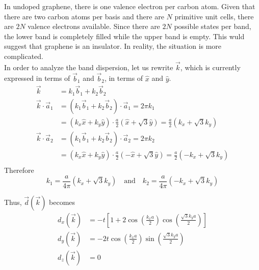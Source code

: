 \documentclass[12pt,a4paper,titlepage]{article}
\newcommand{\trm}[1]{\textrm{#1}} %
\begin{document}
In undoped graphene, there is one valence electron per carbon atom. Given that there are two carbon atoms per basis and there are $N$ primitive unit cells, there are $2N$ valence electrons available. Since there are $2N$ possible states per band, the lower band is completely filled while the upper band is empty. This wuld suggest that graphene is an insulator. In reality, the situation is more complicated.\\

In order to analyze the band dispersion, let us rewrite $\vec{k}$, which is currently expressed in terms of $\vec{b}_{1}$ and $\vec{b}_{2}$, in terms of $\hat{x}$ and $\hat{y}$.
\begin{equation}
\begin{aligned}
\vec{k}&=k_{1}\vec{b}_{1}+k_{2}\vec{b}_{2}\\
\vec{k}\cdot\vec{a}_{1}&=(k_{1}\vec{b}_{1}+k_{2}\vec{b}_{2})\cdot\vec{a}_{1}=2\pi k_{1}\\
&=(k_{x}\hat{x}+k_{y}\hat{y})\cdot\frac{a}{2}(\hat{x}+\sqrt{3}\hat{y})=\frac{a}{2}(k_{x}+\sqrt{3}k_{y})\\
\vec{k}\cdot\vec{a}_{2}&=(k_{1}\vec{b}_{1}+k_{2}\vec{b}_{2})\cdot\vec{a}_{2}=2\pi k_{2}\\
&=(k_{x}\hat{x}+k_{y}\hat{y})\cdot\frac{a}{2}(-\hat{x}+\sqrt{3}\hat{y})=\frac{a}{2}(-k_{x}+\sqrt{3}k_{y})\\
\end{aligned}
\end{equation}
Therefore
\begin{equation}
k_{1}=\frac{a}{4\pi}(k_{x}+\sqrt{3}k_{y})\quad\trm{and}\quad k_{2}=\frac{a}{4\pi}(-k_{x}+\sqrt{3}k_{y})
\end{equation}

Thus, $\vec{d}(\vec{k})$ becomes
\begin{equation}
\begin{aligned}
d_{x}(\vec{k})&=-t\left[1+2\cos\left(\frac{k_{x}a}{2}\right)\cos\left(\frac{\sqrt{3}k_{y}a}{2}\right)\right]\\
d_{y}(\vec{k})&=-2t\cos\left(\frac{k_{x}a}{2}\right)\sin\left(\frac{\sqrt{3}k_{y}a}{2}\right)\\
d_{z}(\vec{k})&=0
\end{aligned}
\end{equation}
\end{document}
